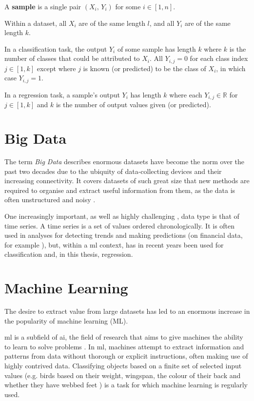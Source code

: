 A \textbf{sample} is a single pair \(\left(X_i,\,Y_i\right)\) for some \(i \in \left[1, n\right]\).

Within a dataset, all \(X_i\) are of the same length \(l\), and all \(Y_i\) are of the same length \(k\).

In a classification task, the output \(Y_i\) of some sample has length \(k\) where \(k\) is the number of classes that could be attributed to \(X_i\). All \(Y_{i,j} = 0\) for each class index \(j \in \left[1, k\right]\) except where \(j\) is known (or predicted) to be the class of \(X_i\), in which case \(Y_{i,j} = 1\).

In a regression task, a sample's output \(Y_i\) has length \(k\) where each \(Y_{i,j} \in \mathbb{R}\) for \(j \in \left[1, k\right]\) and \(k\) is the number of output values given (or predicted).

\section{Big Data}
The term \textit{Big Data} describes enormous datasets have become the norm over the past two decades due to the ubiquity of data-collecting devices and their increasing connectivity. It covers datasets of such great size that new methods are required to organise and extract useful information from them, as the data is often unstructured and noisy \cite[]{fan_mining_2013,chen_big_2014}.

One increasingly important, as well as highly challenging \cite[]{yang_10_2006}, data type is that of time series. A time series is a set of values ordered chronologically. It is often used in analyses for detecting trends and making predictions (on financial data, for example \cite[]{krollner_financial_2010}), but, within a \ac{ml} context, has in recent years been used for classification \cite[]{dau_ucr_2019,ismail_fawaz_deep_2019} and, in this thesis, regression.

\section{Machine Learning}
The desire to extract value from large datasets has led to an enormous increase in the popularity of machine learning (ML).

\ac{ml} is a subfield of \ac{ai}, the field of research that aims to give machines the ability to learn to solve problems \cite[]{goodfellow_deep_2016}. In \ac{ml}, machines attempt to extract information and patterns from data without thorough or explicit instructions, often making use of highly contrived data. Classifying objects based on a finite set of selected input values (e.g. birds based on their weight, wingspan, the colour of their back and whether they have webbed feet \cite[]{harrington_machine_2012}) is a task for which machine learning is regularly used.

